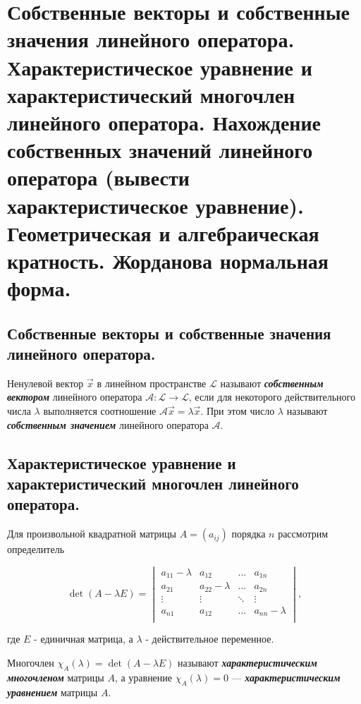 \section{
    Собственные векторы и собственные значения линейного оператора. Характеристическое уравнение и характеристический многочлен линейного оператора. Нахождение собственных значений линейного оператора (вывести характеристическое уравнение). Геометрическая и алгебраическая кратность. Жорданова нормальная форма.
}
\subsection{
    Собственные векторы и собственные значения линейного оператора.
}

\begin{definition}
    Ненулевой вектор $\vec{x}$ в линейном пространстве $\mathcal{L}$ называют \textbf{\textit{собственным вектором}} линейного оператора $\mathscr{A}\colon \mathcal{L} \to \mathcal{L}$, если для некоторого действительного числа $\lambda$ выполняется соотношение $\mathscr{A}\vec{x} = \lambda\vec{x}$. При этом число $\lambda$ называют \textbf{\textit{собственным значением}} линейного оператора $\mathscr{A}$.
\end{definition}

\subsection{
    Характеристическое уравнение и характеристический многочлен линейного оператора.
}

Для произвольной квадратной матрицы $A = (a_{ij})$ порядка $n$ рассмотрим определитель

$$\det(A - \lambda E) = \begin{vmatrix} 
    a_{11} - \lambda & a_{12} & \ldots & a_{1n} \\
    a_{21} & a_{22} - \lambda & \ldots & a_{2n} \\
    \vdots & \vdots & \ddots & \vdots \ \\
    a_{n1} & a_{12} & \ldots & a_{nn} - \lambda \\
\end{vmatrix},$$

где $E$ - единичная матрица, а $\lambda$ - действительное переменное.

\begin{definition}
    Многочлен $\chi_A(\lambda) = \det(A - \lambda E)$ называют \textbf{\textit{характеристическим многочленом}} матрицы $A$, а уравнение $\chi_A(\lambda) = 0$ — \textbf{\textit{характеристическим уравнением}} матрицы $A$.
\end{definition}

